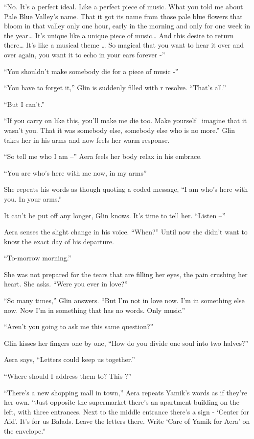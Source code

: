 \documentclass[twoside,11pt]{book}
\begin{document}
``No. It's a perfect ideal. Like a perfect piece of music. What you told me about Pale Blue Valley's name.
That it got its name from those pale blue flowers that bloom in that valley only one hour, early in the morning and
only for one week in the year{\dots} It's unique like a unique piece of music{\ldots} And this desire to return there{\dots}
It's like a musical theme {\dots} So magical that you want to hear it over and over again, you want it to echo in your
ears forever -''

``You shouldn't make somebody die for a piece of music -''

``You have to forget it,'' Glin is suddenly filled with r resolve. ``That's
all.''

``But I can't.''

``If you carry on like this, you'll make me die too. Make yourself
\ imagine that it wasn't you. That it was somebody else, somebody else who is no more.'' Glin takes her
in his arms and now feels her warm response.

``So tell me who I am --'' Aera feels her body relax in his embrace.

``You are who's here with me now, in my arms''

She repeats his words as though quoting a coded message, ``I am who's here with you. In your
arms.''

It can't be put off any longer, Glin knows. It's time to tell her. ``Listen --''

Aera senses the slight change in his voice. ``When?'' Until now she didn't want to know the
exact day of his departure.

``To-morrow morning.''

She was not prepared for the tears that are filling her eyes, the pain crushing her heart. She asks. ``Were
you ever in love?''

``So many times,'' Glin answers. ``But I'm not in love now. I'm in something else
now. Now I'm in something that has no words. Only music.''

``Aren't you going to ask me this same question?''

Glin kisses her fingers one by one, ``How do you divide one soul into two halves?''

Aera says, ``Letters could keep us together.''

``Where should I address them to? This ?''

``There's a new shopping mall in town,'' Aera repeats Yamik's words as if they're her own.
``Just opposite the supermarket there's an apartment building on the left, with three entrances. Next to
the middle entrance there's a sign - `Center for Aid'. It's for us Balads. Leave the letters there. Write `Care of
Yamik for Aera' on the envelope.''
\end{document}
